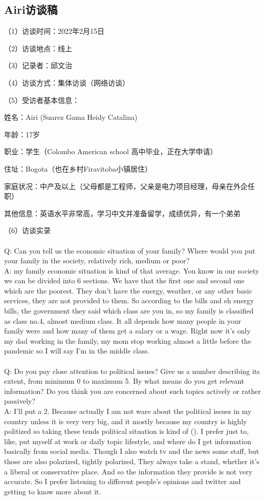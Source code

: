 \documentclass{phyasgn}\usepackage{nag}
\begin{document}
\subsection{Airi访谈稿}
\par （1）访谈时间：2022年2月15日
\par（2）访谈地点：线上
\par（3）记录者：邱文治
\par（4）访谈方式：集体访谈（网络访谈）
\par（5）受访者基本信息：
  \par 姓名：Airi (Suarez Gama Heidy Catalina)
\par 年龄：17岁
\par 职业：学生（Colombo American school 高中毕业，正在大学申请）
\par 住址：Bogota（也在乡村Firavitoba小镇居住）
\par 家庭状况：中产及以上（父母都是工程师，父亲是电力项目经理，母亲在外企任职）
\par 其他信息：英语水平非常高，学习中文并准备留学，成绩优异，有一个弟弟
\par （6）访谈实录\\
\\
Q: Can you tell us the economic situation of your family? Where would you put your family in the society, relatively rich, medium or poor?\\
A: my family economic situation is kind of that average. You know in our society we can be divided into 6 sections. We have that the first one and second one which are the poorest. They don’t have the energy, weather, or any other basic services, they are not provided to them. So according to the bills and eh energy bills, the government they said which class are you in, so my family is classified as class no.4, almost medium class. It all depends how many people in your family were and how many of them get a salary or a wage. Right now it’s only my dad working in the family, my mom stop working almost a little before the pandemic so I will say I’m in the middle class.\\
\\
Q: Do you pay close attention to political issues? Give us a number describing its extent, from minimum 0 to maximum 5. By what means do you get relevant information? Do you think you are concerned about such topics actively or rather passively? \\
A: I’ll put a 2. Because actually I am not ware about the political issues in my country unless it is very very big, and it mostly because my country is highly politized so taking these tends political situation is kind of (). I prefer just to, like, put myself at work or daily topic lifestyle, and where do I get information basically from social media. Though I also watch tv and the news some staff, but those are also polarized, tightly polarized, They always take a stand, whether it's a liberal or conservative place. And so the information they provide is not very accurate. So I prefer listening to different people's opinions and twitter and getting to know more about it.\\
\end{document}
